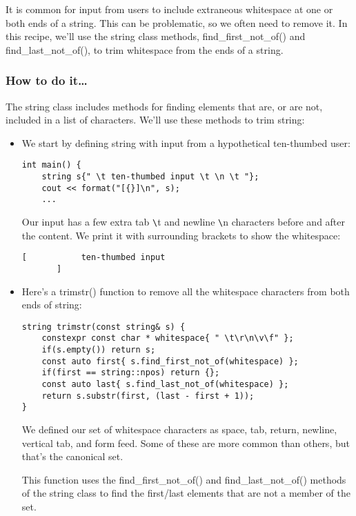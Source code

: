 
It is common for input from users to include extraneous whitespace at one or both ends of a string. This can be problematic, so we often need to remove it. In this recipe, we'll use the string class methods, find\_first\_not\_of() and find\_last\_not\_of(), to trim whitespace from the ends of a string.

\subsubsection{How to do it…}

The string class includes methods for finding elements that are, or are not, included in a list of characters. We'll use these methods to trim string:

\begin{itemize}
\item 
We start by defining string with input from a hypothetical ten-thumbed user:

\begin{lstlisting}[style=styleCXX]
int main() {
	string s{" \t ten-thumbed input \t \n \t "};
	cout << format("[{}]\n", s);
	...
\end{lstlisting}

Our input has a few extra tab \verb|\|t and newline \verb|\|n characters before and after the content. We print it with surrounding brackets to show the whitespace:

\begin{lstlisting}[style=styleCXX]
[           ten-thumbed input
       ]
\end{lstlisting}

\item 
Here's a trimstr() function to remove all the whitespace characters from both ends of string:

\begin{lstlisting}[style=styleCXX]
string trimstr(const string& s) {
	constexpr const char * whitespace{ " \t\r\n\v\f" };
	if(s.empty()) return s;
	const auto first{ s.find_first_not_of(whitespace) };
	if(first == string::npos) return {};
	const auto last{ s.find_last_not_of(whitespace) };
	return s.substr(first, (last - first + 1));
}
\end{lstlisting}

We defined our set of whitespace characters as space, tab, return, newline, vertical tab, and form feed. Some of these are more common than others, but that's the canonical set.

This function uses the find\_first\_not\_of() and find\_last\_not\_of() methods of the string class to find the first/last elements that are not a member of the set.


\end{itemize}
